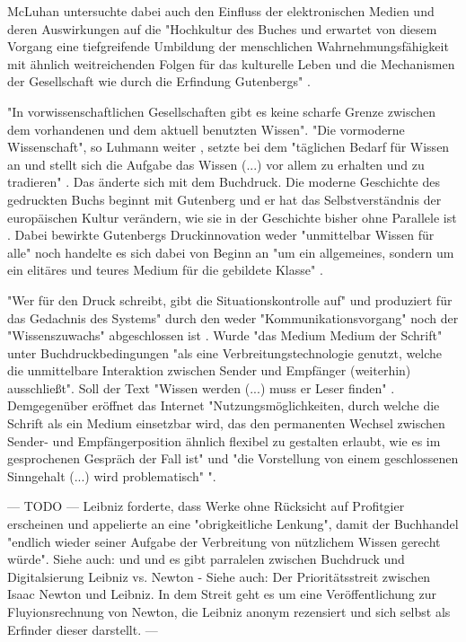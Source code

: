 McLuhan untersuchte dabei auch den Einfluss der elektronischen Medien \cite{mcluhan_1963_gutenberg} und deren Auswirkungen auf die "Hochkultur des Buches und erwartet von diesem Vorgang eine tiefgreifende Umbildung der menschlichen Wahrnehmungsfähigkeit mit ähnlich weitreichenden Folgen für das kulturelle Leben und die Mechanismen der Gesellschaft wie durch die Erfindung Gutenbergs" \cite{Wenzel_2003}. 

"In vorwissenschaftlichen Gesellschaften gibt es keine scharfe Grenze zwischen dem vorhandenen und dem aktuell benutzten Wissen"\cite{Luhmann1998}. "Die vormoderne Wissenschaft", so Luhmann weiter , setzte bei dem "täglichen Bedarf für Wissen an und stellt sich die Aufgabe das Wissen (...) vor allem zu erhalten und zu tradieren" \cite{Luhmann1998}. Das änderte sich mit dem Buchdruck. Die moderne Geschichte des gedruckten Buchs beginnt mit Gutenberg \cite{wittmann_1999_geschichte} und er hat das Selbstverständnis der europäischen Kultur verändern, wie sie in der Geschichte bisher ohne Parallele ist \cite{giesecke_1991_buchdruck}. Dabei bewirkte Gutenbergs Druckinnovation weder "unmittelbar Wissen für alle" noch handelte es sich dabei von Beginn an "um ein allgemeines, sondern um ein elitäres und teures Medium für die gebildete Klasse" \cite{hartmann_2008_medien}. 

"Wer für den Druck schreibt, gibt die Situationskontrolle auf" und produziert für das Gedachnis des Systems" durch den weder "Kommunikationsvorgang" noch der "Wissenszuwachs" abgeschlossen ist \cite{Luhmann1998}. Wurde "das Medium Medium der Schrift" unter Buchdruckbedingungen "als eine Verbreitungstechnologie genutzt, welche die unmittelbare Interaktion zwischen Sender und Empfänger (weiterhin) ausschließt". Soll der Text "Wissen werden (...) muss er Leser finden" \cite{Luhmann1998}. Demgegenüber eröffnet das Internet "Nutzungsmöglichkeiten, durch welche die Schrift als ein Medium einsetzbar wird, das den permanenten Wechsel zwischen Sender- und Empfängerposition ähnlich flexibel zu gestalten erlaubt, wie es im gesprochenen Gespräch der Fall ist" und "die Vorstellung von einem geschlossenen Sinngehalt (...) wird problematisch" \cite{sandbothe_2000_pragmatische}". 

--- TODO ---
Leibniz forderte, dass Werke ohne Rücksicht auf Profitgier erscheinen und appelierte an eine "obrigkeitliche Lenkung", damit der Buchhandel "endlich wieder seiner Aufgabe der Verbreitung von nützlichem Wissen gerecht würde"\cite{wittmann_1999_geschichte}.
Siehe auch: \cite{Kittler_1995} und \cite{Knop_2008} und es gibt parralelen zwischen Buchdruck und Digitalsierung \cite{wittmann_1999_geschichte}
Leibniz vs. Newton - Siehe auch: \cite{Aschoff_1974}
Der Prioritätsstreit zwischen Isaac Newton und Leibniz. In dem Streit geht es um eine Veröffentlichung zur Fluyionsrechnung von Newton, die Leibniz anonym rezensiert und sich selbst als Erfinder dieser darstellt.\cite{2013_leibniz}
---

